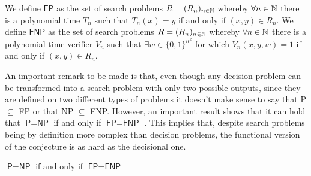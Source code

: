 \newpage

\begin{definition}
 We define $\mathsf{FP}$ as the set of search problems $R = (R_n)_{n \in \mathbb{N}}$ whereby $\forall n \in \mathbb{N}$ there is a polynomial time \TM $T_n$ such that $T_n(x) = y$ if and only if $(x,y) \in R_n$. We define $\mathsf{FNP}$ as the set of search problems $R = (R_n)_{n \in \mathbb{N}}$ whereby $\forall n \in \mathbb{N}$ there is a polynomial time verifier $V_n$ such that $\exists w \in \{0,1\}^{n^k}$ for which $V_n(x,y,w) = 1$ if and only if $(x,y) \in R_n$. 
\end{definition}

An important remark to be made is that, even though any decision problem can be transformed into a search problem with only two possible outputs, since they are defined on two different types of problems it doesn't make sense to say that \textsf{P} $\subseteq$ \textsf{FP} or that \textsf{NP} $\subseteq$ \textsf{FNP}. However, an important result shows that it can hold that $\textsf{P} = \textsf{NP} $ if and only if $\textsf{FP} = \textsf{FNP}$ \cite{decision_vs_search, fp_vs_p}. This implies that, despite search problems being by definition more complex than decision problems, the functional version of the conjecture is as hard as the decisional one.

\begin{theorem}
    $\textsf{P} = \textsf{NP}$ if and only if $\textsf{FP} = \textsf{FNP}$
\end{theorem}

